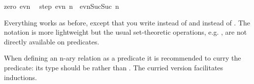 \begin{isabellebody}
zero{\isacharcolon}\ {\isachardoublequoteopen}evn\ {}{\isachardoublequoteclose}\ {\isacharbar}\isanewline
step{\isacharcolon}\ {\isachardoublequoteopen}evn\ n\ {\isasymLongrightarrow}\ evn{\isacharparenleft}Suc{\isacharparenleft}Suc\ n{\isacharparenright}{\isacharparenright}{\isachardoublequoteclose}%
\begin{isamarkuptext}%
\noindent Everything works as before, except that
you write  instead of  and
 instead of . The notation is more
lightweight but the usual set-theoretic operations, e.g. ,
are not directly available on predicates.

When defining an n-ary relation as a predicate it is recommended to curry
the predicate: its type should be  rather than
. The curried version facilitates inductions.
%
\end{isamarkuptext}%
\isamarkuptrue%
%
\isadelimtheory
%
\endisadelimtheory
%
\isatagtheory
%
\endisatagtheory
{\isafoldtheory}%
%
\isadelimtheory
%
\endisadelimtheory
\end{isabellebody}%
